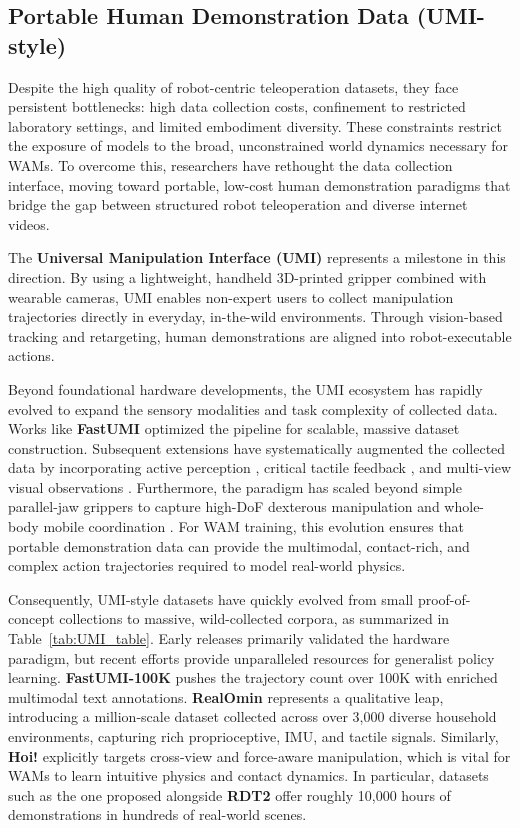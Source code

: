 \subsection{Portable Human Demonstration Data (UMI-style)}
\label{sec:data_umi}
Despite the high quality of robot-centric teleoperation datasets, they face persistent bottlenecks: high data collection costs, confinement to restricted laboratory settings, and limited embodiment diversity. These constraints restrict the exposure of models to the broad, unconstrained world dynamics necessary for WAMs. To overcome this, researchers have rethought the data collection interface, moving toward portable, low-cost human demonstration paradigms that bridge the gap between structured robot teleoperation and diverse internet videos.

The \textbf{Universal Manipulation Interface (UMI)} \cite{UMI} represents a milestone in this direction. By using a lightweight, handheld 3D-printed gripper combined with wearable cameras, UMI enables non-expert users to collect manipulation trajectories directly in everyday, in-the-wild environments. Through vision-based tracking and retargeting, human demonstrations are aligned into robot-executable actions.

Beyond foundational hardware developments, the UMI ecosystem has rapidly evolved to expand the sensory modalities and task complexity of collected data. Works like \textbf{FastUMI} \cite{FastUMI} optimized the pipeline for scalable, massive dataset construction. Subsequent extensions have systematically augmented the collected data by incorporating active perception \cite{ActiveUMI}, critical tactile feedback \cite{exUMI, Tactile-Conditioned_Diffusion_Policy}, and multi-view visual observations \cite{MV-UMI}. 
Furthermore, the paradigm has scaled beyond simple parallel-jaw grippers to capture high-DoF dexterous manipulation \cite{DexUMI} and whole-body mobile coordination \cite{UMI_on_Legs, HoMMI}. For WAM training, this evolution ensures that portable demonstration data can provide the multimodal, contact-rich, and complex action trajectories required to model real-world physics.

Consequently, UMI-style datasets have quickly evolved from small proof-of-concept collections to massive, wild-collected corpora, as summarized in Table~\ref{tab:UMI_table}. Early releases primarily validated the hardware paradigm, but recent efforts provide unparalleled resources for generalist policy learning. \textbf{FastUMI-100K} \cite{FastUMI-100K} pushes the trajectory count over 100K with enriched multimodal text annotations. \textbf{RealOmin} \cite{RealOmin} represents a qualitative leap, introducing a million-scale dataset collected across over 3,000 diverse household environments, capturing rich proprioceptive, IMU, and tactile signals. Similarly, \textbf{Hoi!} \cite{Hoi!} explicitly targets cross-view and force-aware manipulation, which is vital for WAMs to learn intuitive physics and contact dynamics. 
In particular, datasets such as the one proposed alongside \textbf{RDT2} \cite{RDT2} offer roughly 10,000 hours of demonstrations in hundreds of real-world scenes. 

